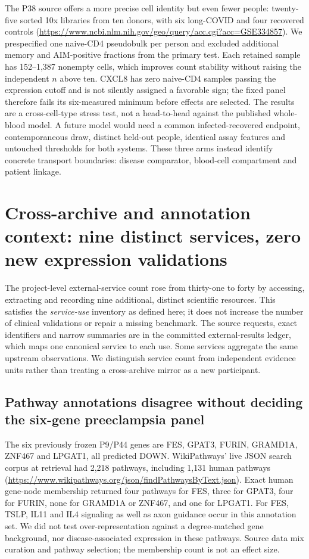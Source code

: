 \documentclass[11pt,a4paper]{article}
\begin{document}
The P38 source offers a more precise cell identity but even fewer people: twenty-five sorted 10x libraries from ten donors, with six long-COVID and four recovered controls (\url{https://www.ncbi.nlm.nih.gov/geo/query/acc.cgi?acc=GSE334857}). We prespecified one naive-CD4 pseudobulk per person and excluded additional memory and AIM-positive fractions from the primary test. Each retained sample has 152--1,387 nonempty cells, which improves count stability without raising the independent $n$ above ten. CXCL8 has zero naive-CD4 samples passing the expression cutoff and is not silently assigned a favorable sign; the fixed panel therefore fails its six-measured minimum before effects are selected. The results are a cross-cell-type stress test, not a head-to-head against the published whole-blood model. A future model would need a common infected-recovered endpoint, contemporaneous draw, distinct held-out people, identical assay features and untouched thresholds for both systems. These three arms instead identify concrete transport boundaries: disease comparator, blood-cell compartment and patient linkage.

\section{Cross-archive and annotation context: nine distinct services, zero new expression validations}
The project-level external-service count rose from thirty-one to forty by accessing, extracting and recording nine additional, distinct scientific resources. This satisfies the \emph{service-use} inventory as defined here; it does not increase the number of clinical validations or repair a missing benchmark. The source requests, exact identifiers and narrow summaries are in the committed external-results ledger, which maps one canonical service to each use. Some services aggregate the same upstream observations. We distinguish service count from independent evidence units rather than treating a cross-archive mirror as a new participant.

\subsection{Pathway annotations disagree without deciding the six-gene preeclampsia panel}
The six previously frozen P9/P44 genes are FES, GPAT3, FURIN, GRAMD1A, ZNF467 and LPGAT1, all predicted DOWN. WikiPathways' live JSON search corpus at retrieval had 2,218 pathways, including 1,131 human pathways (\url{https://www.wikipathways.org/json/findPathwaysByText.json}). Exact human gene-node membership returned four pathways for FES, three for GPAT3, four for FURIN, none for GRAMD1A or ZNF467, and one for LPGAT1. For FES, TSLP, IL11 and IL4 signaling as well as axon guidance occur in this annotation set. We did not test over-representation against a degree-matched gene background, nor disease-associated expression in these pathways. Source data mix curation and pathway selection; the membership count is not an effect size.
\end{document}
